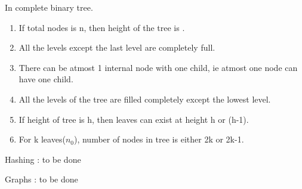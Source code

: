 \begin{enumerate}
    \begin{minipage}{\linewidth}
    \item In complete binary tree.
    \begin{enumerate}
        \item         If total nodes is n, then height of the tree is \fillin[].
        \item         All the levels except the last level are completely full.
        \item         There can be atmost 1 internal node with one child, ie atmost one node can have one child.
        \item         All the levels of the tree are filled completely except the lowest level.
        \item         If height of tree is h, then leaves can exist at height h or (h-1).
        \item         For k leaves(\(n_0\)), number of nodes in tree is either 2k or 2k-1.
    \end{enumerate}
    \end{minipage}

    \item Hashing : to be done

    \item Graphs  : to be done

\end{enumerate}























